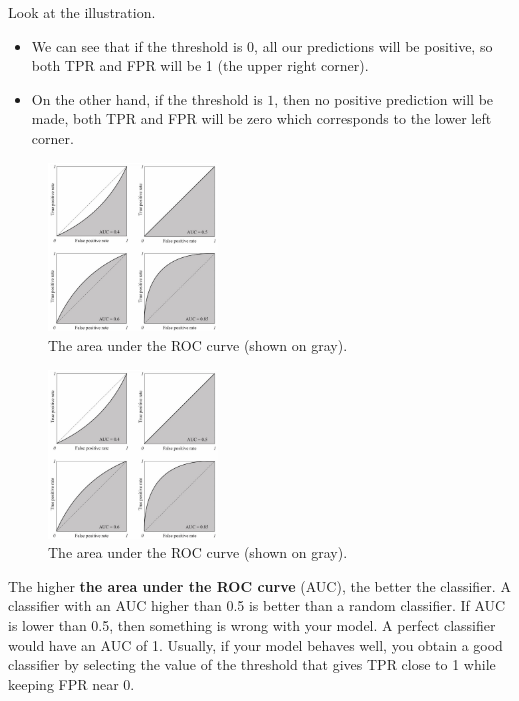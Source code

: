 \documentclass[8pt,dvipsnames]{beamer}
\begin{document}
\begin{frame}
	Look at the illustration.
	\begin{itemize}
		\item We can see that if the threshold is \(0\), all our predictions will be positive, so both TPR and FPR will be 1 (the upper right corner).
		\item On the other hand, if the threshold is \(1\), then no positive prediction will be made, both TPR and FPR will be zero which corresponds to the lower left corner.
	\end{itemize}

	\begin{figure}
		\centering
		\includegraphics[width=0.4\textwidth]{imgs/Basic_Practice_3.jpeg}
		\caption{The area under the ROC curve (shown on gray).}
	\end{figure}
\end{frame}

\begin{frame}
	\begin{figure}
		\centering
		\includegraphics[width=0.4\textwidth]{imgs/Basic_Practice_3.jpeg}
		\caption{The area under the ROC curve (shown on gray).}
	\end{figure}
	The higher \textbf{the area under the ROC curve} (AUC), the better the classifier. A classifier with an AUC higher than 0.5 is better than a random classifier. If AUC is lower than 0.5, then something is wrong with your model. A perfect classifier would have an AUC of 1. Usually, if your model behaves well, you obtain a good classifier by selecting the value of the threshold that gives TPR close to 1 while keeping FPR near 0.
\end{frame}
\end{document}
